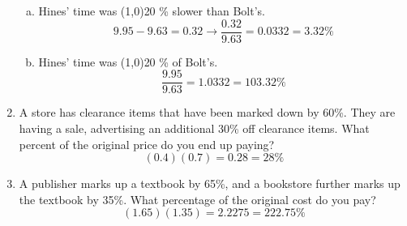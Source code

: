 \begin{enumerate}
\begin{enumerate}[(a)]
\item Hines' time was \line(1,0){20} \% slower than Bolt's. 
\[9.95 - 9.63 = 0.32 \longrightarrow \dfrac{0.32}{9.63} = 0.0332 = 3.32\%\]

\item Hines' time was \line(1,0){20} \% of Bolt's. 
\[\dfrac{9.95}{9.63} = 1.0332 = 103.32\%\]
\end{enumerate}

\item A store has clearance items that have been marked down by 60\%.  They are having a sale, advertising an additional 30\% off clearance items.  What percent of the original price do you end up paying? 
\[(0.4)(0.7) = 0.28 = 28\%\]

\item A publisher marks up a textbook by 65\%, and a bookstore further marks up the textbook by 35\%.  What percentage of the original cost do you pay? 
\[(1.65)(1.35) = 2.2275 = 222.75\%\]
\end{enumerate}